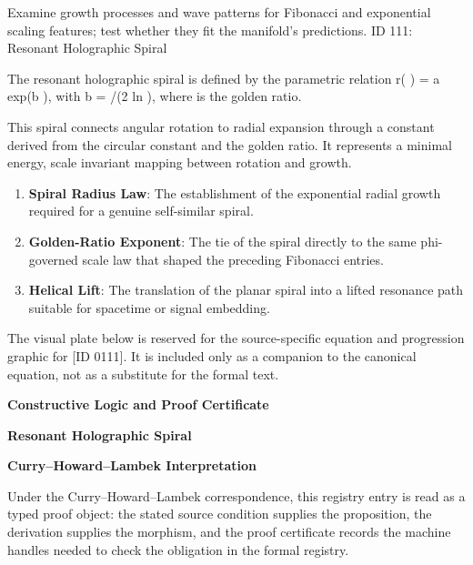 Examine growth processes and wave patterns for Fibonacci and exponential scaling features; test whether they fit the manifold's predictions. ID 111: Resonant Holographic Spiral

The resonant holographic spiral is defined by the parametric relation r( ) = a exp(b  ), with b =  /(2 ln  ), where   is the golden ratio.

This spiral connects angular rotation to radial expansion through a constant derived from the circular constant   and the golden ratio. It represents a minimal energy, scale invariant mapping between rotation and growth.
\endgroup

\begin{enumerate}[leftmargin=1.6em,itemsep=6pt,topsep=4pt]
\item \textbf{Spiral Radius Law}: The establishment of the exponential radial growth required for a genuine self-similar spiral.
\item \textbf{Golden-Ratio Exponent}: The tie of the spiral directly to the same phi-governed scale law that shaped the preceding Fibonacci entries.
\item \textbf{Helical Lift}: The translation of the planar spiral into a lifted resonance path suitable for spacetime or signal embedding.
\end{enumerate}

\begingroup\footnotesize\sloppy
The visual plate below is reserved for the source-specific equation and progression graphic for [ID 0111]. It is included only as a companion to the canonical equation, not as a substitute for the formal text.
\par\endgroup
\ifTZPDarkEdition
{}
\fi

\clearpage
\begingroup\tzpsupportsetup
\noindent\textbf{\fontsize{10.8pt}{12.8pt}\selectfont [ID 0111] Constructive Logic and Proof Certificate}\par
\noindent\textbf{\fontsize{10pt}{12pt}\selectfont Resonant Holographic Spiral}\par
\vspace{0.45em}
\begingroup
\footnotesize
\setlength{\parskip}{0.22em}
\setlength{\parindent}{0pt}
\noindent\textbf{Curry--Howard--Lambek Interpretation}\par
Under the Curry--Howard--Lambek correspondence, this registry entry is read as a typed proof
object: the stated source condition supplies the proposition, the derivation supplies the
morphism, and the proof certificate records the machine handles needed to check the obligation
in the formal registry.

